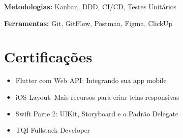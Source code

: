 \documentclass[10pt, letterpaper]{article}
\begin{document}
\textbf{Metodologias:} Kanban, DDD, CI/CD, Testes Unitários

\textbf{Ferramentas:} Git, GitFlow, Postman, Figma, ClickUp

\section{Certificações}
\begin{itemize}
    \item Flutter com Web API: Integrando sua app mobile
    \item iOS Layout: Mais recursos para criar telas responsivas
    \item Swift Parte 2: UIKit, Storyboard e o Padrão Delegate
    \item TQI Fullstack Developer
\end{itemize}
\end{document}
